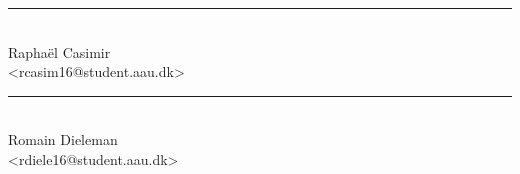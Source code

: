 \begin{center}

\begin{minipage}[b]{0.45\textwidth}
	\centering
	\rule{\textwidth}{0.5pt}\\
	Raphaël Casimir\\
	{\footnotesize <rcasim16@student.aau.dk>}
\end{minipage}
\hspace{0.3cm}
\begin{minipage}[b]{0.45\textwidth}
	\centering
	\rule{\textwidth}{0.5pt}\\
	Romain Dieleman\\
	{\footnotesize <rdiele16@student.aau.dk>}
\end{minipage}



\end{center}

